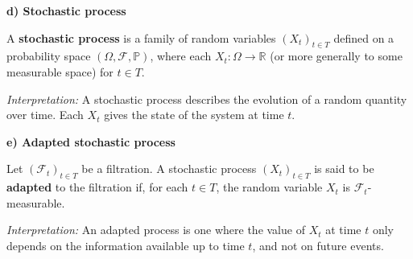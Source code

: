 \vspace{1em}
\textbf{d) Stochastic process}

A \textbf{stochastic process} is a family of random variables \( (X_t)_{t \in T} \) defined on a probability space \( (\Omega, \mathcal{F}, \mathbb{P}) \), where each \( X_t : \Omega \to \mathbb{R} \) (or more generally to some measurable space) for \( t \in T \).

\textit{Interpretation:} A stochastic process describes the evolution of a random quantity over time. Each \( X_t \) gives the state of the system at time \( t \).

\vspace{1em}
\textbf{e) Adapted stochastic process}

Let \( (\mathcal{F}_t)_{t \in T} \) be a filtration. A stochastic process \( (X_t)_{t \in T} \) is said to be \textbf{adapted} to the filtration if, for each \( t \in T \), the random variable \( X_t \) is \( \mathcal{F}_t \)-measurable.

\textit{Interpretation:} An adapted process is one where the value of \( X_t \) at time \( t \) only depends on the information available up to time \( t \), and not on future events.